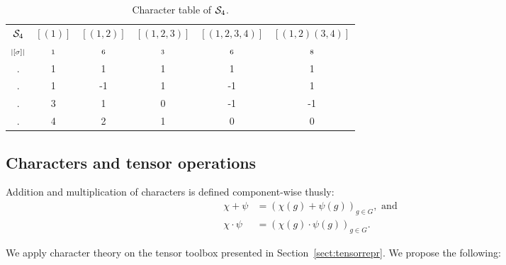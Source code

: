 \begin{table}[hbt!]
		\centering
		\begin{tabular}{c | c c c c c}
			  $\mathcal{S}_4$   & $[(1)]$ & $[(1,2)]$ & $[(1,2,3)]$ & $[(1,2,3,4)]$ & $[(1,2)(3,4)]$ \\
			 $\scriptstyle|[\sigma]|$ & $\scriptstyle1$       & $\scriptstyle6$         & $\scriptstyle3$           & $\scriptstyle6$             & $\scriptstyle8$              \\ \hline
			   \Triv.    & 1       & 1         & 1           & 1             & 1              \\
			   \Alt.     & 1       & -1        & 1           & -1            & 1              \\
			   \Stan.    & 3       & 1         & 0           & -1            & -1             \\
			   \Perm.    & 4       & 2         & 1           & 0             & 0              \\ %
		\end{tabular}
		\caption{Character table of $\mathcal{S}_4$.}
		\label{table:chartableSym4}
\end{table}


\subsection{Characters and tensor operations}

Addition and multiplication of characters is defined component-wise thusly:
\begin{align*}
	\chi + \psi &=  (\chi(g) + \psi(g))_{g \in G}, \text{ and} \\
	\chi \cdot \psi &= (\chi(g) \cdot \psi(g))_{g \in G}.
\end{align*}

We apply character theory on the tensor toolbox presented in Section~\ref{sect:tensorrepr}. We propose the following:

